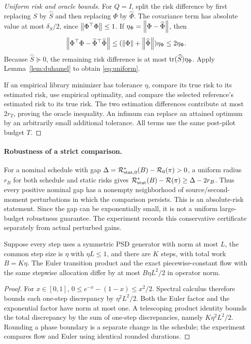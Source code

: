 \begin{proof}[Uniform risk and oracle bounds]
For $Q=I$, split the risk difference by first replacing $S$ by $\widehat S$ and then replacing $\Phi$ by $\widehat\Phi$. The covariance term has absolute value at most $\delta_S/2$, since $\left\lVert\Phi^\top\Phi\right\rVert\le1$. If $\eta_\Phi=\left\lVert\Phi-\widehat\Phi\right\rVert$, then
\[
 \left\lVert\Phi^\top\Phi-\widehat\Phi^\top\widehat\Phi\right\rVert
 \le(\left\lVert\Phi\right\rVert+\left\lVert\widehat\Phi\right\rVert)\eta_\Phi\le2\eta_\Phi.
\]
Because $\widehat S\succeq0$, the remaining risk difference is at most $\operatorname{tr}(\widehat S)\eta_\Phi$. Apply Lemma~\ref{lem:duhamel} to obtain \eqref{eq:uniform}.

If an empirical library minimizer has tolerance $\eta$, compare its true risk to its estimated risk, use empirical optimality, and compare the selected reference's estimated risk to its true risk. The two estimation differences contribute at most $2r_T$, proving the oracle inequality. An infimum can replace an attained optimum by an arbitrarily small additional tolerance. All terms use the same post-pilot budget $T$.
\end{proof}

\paragraph{Robustness of a strict comparison.}
For a nominal schedule with gap $\Delta=\mathcal R_{\mathrm{stat},0}^*(B)-\mathcal R_0(\pi)>0$, a uniform radius $r_B$ for both schedule and static risks gives
$\mathcal R_{\mathrm{stat}}^*(B)-\mathcal R(\pi)\ge\Delta-2r_B$.
Thus every positive nominal gap has a nonempty neighborhood of source/second-moment perturbations in which the comparison persists. This is an absolute-risk statement. Since the gap can be exponentially small, it is not a uniform large-budget robustness guarantee. The experiment records this conservative certificate separately from actual perturbed gains.

\begin{lemma}\label{lem:euler}
Suppose every step uses a symmetric PSD generator with norm at most $L$, the common step size is $\eta$ with $\eta L\le1$, and there are $K$ steps, with total work $B=K\eta$. The Euler transition product and the exact piecewise-constant flow with the same stepwise allocation differ by at most $B\eta L^2/2$ in operator norm.
\end{lemma}
\begin{proof}
For $x\in[0,1]$, $0\le e^{-x}-(1-x)\le x^2/2$. Spectral calculus therefore bounds each one-step discrepancy by $\eta^2L^2/2$. Both the Euler factor and the exponential factor have norm at most one. A telescoping product identity bounds the total discrepancy by the sum of one-step discrepancies, namely $K\eta^2L^2/2$. Rounding a phase boundary is a separate change in the schedule; the experiment compares flow and Euler using identical rounded durations.
\end{proof}

